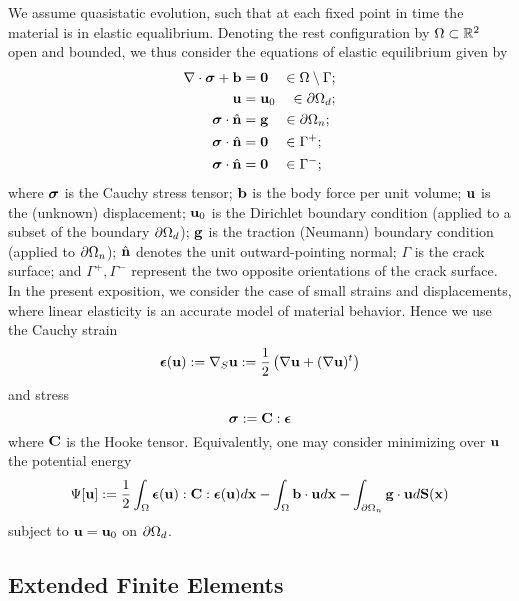 We assume quasistatic evolution, such that at each fixed point in time the material is in elastic equalibrium. Denoting the rest configuration by $\Omega \subset \mathbb{R}^2$ open and bounded, we thus consider the equations of elastic equilibrium given by
\begin{align*}
\nabla \cdot \boldsymbol{\sigma} + \mathbf{b} & = \mathbf{0} \quad \in \Omega \setminus \Gamma; \\
\mathbf{u} & = \mathbf{u}_0 \quad \in \partial\Omega_d; \\
\boldsymbol{\sigma} \cdot \hat{\mathbf{n}} & = \mathbf{g} \quad \in \partial\Omega_n; \\
\boldsymbol{\sigma} \cdot \hat{\mathbf{n}} & = \mathbf{0} \quad \in \Gamma^+; \\
\boldsymbol{\sigma} \cdot \hat{\mathbf{n}} & = \mathbf{0} \quad \in \Gamma^-;
\end{align*}
where $\boldsymbol{\sigma}$ is the Cauchy stress tensor; $\mathbf{b}$ is the body force per unit volume; $\mathbf{u}$ is the (unknown) displacement; $\mathbf{u}_0$ is the Dirichlet boundary condition (applied to a subset of the boundary $\partial\Omega_d$); $\mathbf{g}$ is the traction (Neumann) boundary condition (applied to $\partial\Omega_n$); $\hat{\mathbf{n}}$ denotes the unit outward-pointing normal; $\Gamma$ is the crack surface; and $\Gamma^+, \Gamma^-$ represent the two opposite orientations of the crack surface. In the present exposition, we consider the case of small strains and displacements, where linear elasticity is an accurate model of material behavior. Hence we use the Cauchy strain
\begin{equation*}
\boldsymbol{\epsilon}(\mathbf{u}) := \nabla_S \mathbf{u} := \frac{1}{2} \left( \nabla \mathbf{u} + (\nabla \mathbf{u})^t \right)
\end{equation*}
and stress
\begin{equation*}
\boldsymbol{\sigma} := \mathbf{C} : \boldsymbol{\epsilon}
\end{equation*}
where $\mathbf{C}$ is the Hooke tensor. Equivalently, one may consider minimizing over $\mathbf{u}$ the potential energy
\begin{equation*}
\Psi[\mathbf{u}] := \frac{1}{2} \int_{\Omega} \boldsymbol{\epsilon}(\mathbf{u}) : \mathbf{C} : \boldsymbol{\epsilon}(\mathbf{u}) d\mathbf{x} - \int_{\Omega} \mathbf{b} \cdot \mathbf{u} d\mathbf{x} - \int_{\partial\Omega_n} \mathbf{g} \cdot \mathbf{u} d\mathbf{S}(\mathbf{x})
\end{equation*}
subject to $\mathbf{u} = \mathbf{u}_0$ on $\partial\Omega_d$.

\subsection{Extended Finite Elements} \label{sec:chap1.xfem}

